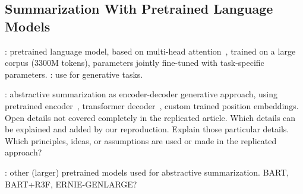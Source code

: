 \subsection{Summarization With Pretrained Language Models}

\citeauthor{DevlinCLT2019}: pretrained language model, based on multi-head attention~\cite{VaswaniSPUJGKP2017}, trained on a large corpus (3300M tokens), \Bert parameters jointly fine-tuned with task-specific parameters.
\citeauthor{Edunov2019?,Rothe2019?}: use \Bert for generative tasks.

\citeauthor{LiuL2019}: abstractive summarization as encoder-decoder generative approach, using pretrained \Bert encoder~\cite{DevlinCLT2019}, transformer decoder~\cite{VaswaniSPUJGKP2017}, custom trained position embeddings.
Open details not covered completely in the replicated article.
Which details can be explained and added by our reproduction.
Explain those particular details.
Which principles, ideas, or assumptions are used or made in the replicated approach?

\citeauthor{???}: other (larger) pretrained models used for abstractive summarization.
BART, BART+R3F, ERNIE-GENLARGE?
